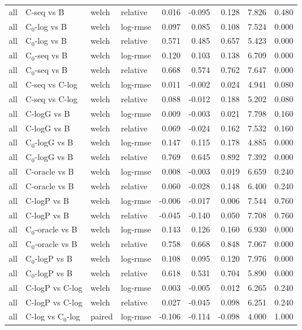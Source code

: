 \begin{longtable}{llllrrrrr}
all & C-seq vs B & welch & relative & 0.016 & -0.095 & 0.128 & 7.826 & 0.480 \\
all & C$_0$-log vs B & welch & log-rmse & 0.097 & 0.085 & 0.108 & 7.524 & 0.000 \\
all & C$_0$-log vs B & welch & relative & 0.571 & 0.485 & 0.657 & 5.423 & 0.000 \\
all & C$_0$-seq vs B & welch & log-rmse & 0.120 & 0.103 & 0.138 & 6.709 & 0.000 \\
all & C$_0$-seq vs B & welch & relative & 0.668 & 0.574 & 0.762 & 7.647 & 0.000 \\
all & C-seq vs C-log & welch & log-rmse & 0.011 & -0.002 & 0.024 & 4.941 & 0.080 \\
all & C-seq vs C-log & welch & relative & 0.088 & -0.012 & 0.188 & 5.202 & 0.080 \\
all & C-logG vs B & welch & log-rmse & 0.009 & -0.003 & 0.021 & 7.798 & 0.160 \\
all & C-logG vs B & welch & relative & 0.069 & -0.024 & 0.162 & 7.532 & 0.160 \\
all & C$_0$-logG vs B & welch & log-rmse & 0.147 & 0.115 & 0.178 & 4.885 & 0.000 \\
all & C$_0$-logG vs B & welch & relative & 0.769 & 0.645 & 0.892 & 7.392 & 0.000 \\
all & C-oracle vs B & welch & log-rmse & 0.008 & -0.003 & 0.019 & 6.659 & 0.240 \\
all & C-oracle vs B & welch & relative & 0.060 & -0.028 & 0.148 & 6.400 & 0.240 \\
all & C-logP vs B & welch & log-rmse & -0.006 & -0.017 & 0.006 & 7.544 & 0.760 \\
all & C-logP vs B & welch & relative & -0.045 & -0.140 & 0.050 & 7.708 & 0.760 \\
all & C$_0$-oracle vs B & welch & log-rmse & 0.143 & 0.126 & 0.160 & 6.930 & 0.000 \\
all & C$_0$-oracle vs B & welch & relative & 0.758 & 0.668 & 0.848 & 7.067 & 0.000 \\
all & C$_0$-logP vs B & welch & log-rmse & 0.108 & 0.095 & 0.120 & 7.976 & 0.000 \\
all & C$_0$-logP vs B & welch & relative & 0.618 & 0.531 & 0.704 & 5.890 & 0.000 \\
all & C-logP vs C-log & welch & log-rmse & 0.003 & -0.005 & 0.012 & 6.265 & 0.240 \\
all & C-logP vs C-log & welch & relative & 0.027 & -0.045 & 0.098 & 6.251 & 0.240 \\
all & C-log vs C$_0$-log & paired & log-rmse & -0.106 & -0.114 & -0.098 & 4.000 & 1.000 \\

\end{longtable}
